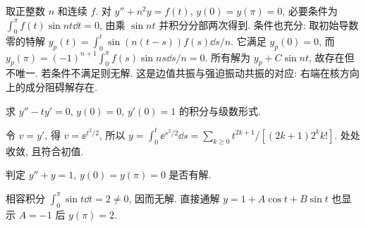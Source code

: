 取正整数 $n$ 和连续 $f$. 对 $y''+n^2y=f(t)$, $y(0)=y(\pi)=0$, 必要条件为 $\int_0^\pi f(t)\sin nt\dd t=0$, 由乘 $\sin nt$ 并积分分部两次得到. 条件也充分: 取初始导数零的特解
$y_p(t)=\int_0^t\sin(n(t-s))f(s)\dd s/n$.
它满足 $y_p(0)=0$, 而 $y_p(\pi)=(-1)^{n+1}\int_0^\pi f(s)\sin ns\dd s/n=0$. 所有解为 $y_p+C\sin nt$, 故存在但不唯一. 若条件不满足则无解. 这是边值共振与强迫振动共振的对应: 右端在核方向上的成分阻碍解存在.
\begin{exercise}求 $y''-ty'=0$, $y(0)=0$, $y'(0)=1$ 的积分与级数形式.\end{exercise}
\begin{solution}令 $v=y'$, 得 $v=\ee^{t^2/2}$, 所以 $y=\int_0^t\ee^{s^2/2}\dd s=\sum_{k\ge0}t^{2k+1}/[(2k+1)2^kk!]$. 处处收敛, 且符合初值.\end{solution}
\begin{exercise}判定 $y''+y=1$, $y(0)=y(\pi)=0$ 是否有解.\end{exercise}
\begin{solution}相容积分 $\int_0^\pi\sin t\dd t=2\ne0$, 因而无解. 直接通解 $y=1+A\cos t+B\sin t$ 也显示 $A=-1$ 后 $y(\pi)=2$.\end{solution}
